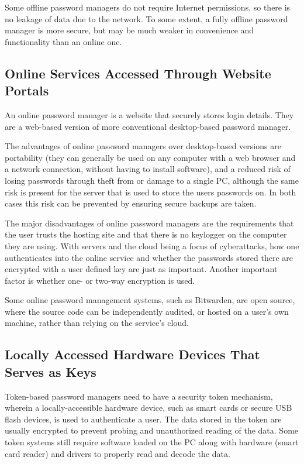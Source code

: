 Some offline password managers do not require Internet permissions, so there is no leakage of data due to the network. To some extent, a fully offline password manager is more secure, but may be much weaker in convenience and functionality than an online one.


\subsection{Online Services Accessed Through Website Portals}

An online password manager is a website that securely stores login details. They are a web-based version of more conventional desktop-based password manager.

The advantages of online password managers over desktop-based versions are portability (they can generally be used on any computer with a web browser and a network connection, without having to install software), and a reduced risk of losing passwords through theft from or damage to a single PC, although the same risk is present for the server that is used to store the users passwords on. In both cases this risk can be prevented by ensuring secure backups are taken.

The major disadvantages of online password managers are the requirements that the user trusts the hosting site and that there is no keylogger on the computer they are using. With servers and the cloud being a focus of cyberattacks, how one authenticates into the online service and whether the passwords stored there are encrypted with a user defined key are just as important. Another important factor is whether one- or two-way encryption is used.

Some online password management systems, such as Bitwarden, are open source, where the source code can be independently audited, or hosted on a user's own machine, rather than relying on the service's cloud.

\subsection{Locally Accessed Hardware Devices That Serves as Keys}

Token-based password managers need to have a security token mechanism, wherein a locally-accessible hardware device, such as smart cards or secure USB flash devices, is used to authenticate a user. The data stored in the token are usually encrypted to prevent probing and unauthorized reading of the data. Some token systems still require software loaded on the PC along with hardware (smart card reader) and drivers to properly read and decode the data.

